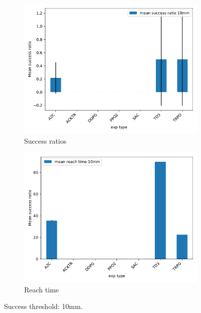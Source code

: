 \documentclass{article}
\begin{document}
\begin{figure}[H]
\centering
\begin{subfigure}{0.49\textwidth}
  \centering
  \includegraphics[width=\textwidth]{../success_10mm.pdf}
  \caption{Success ratios} 
\end{subfigure}
\begin{subfigure}{0.49\textwidth}
  \centering
  \includegraphics[width=\textwidth]{../reachtime_10mm.pdf} 
  \caption{Reach time}
\end{subfigure}
\caption{Success threshold: 10mm.}
\end{figure}
\end{document}
